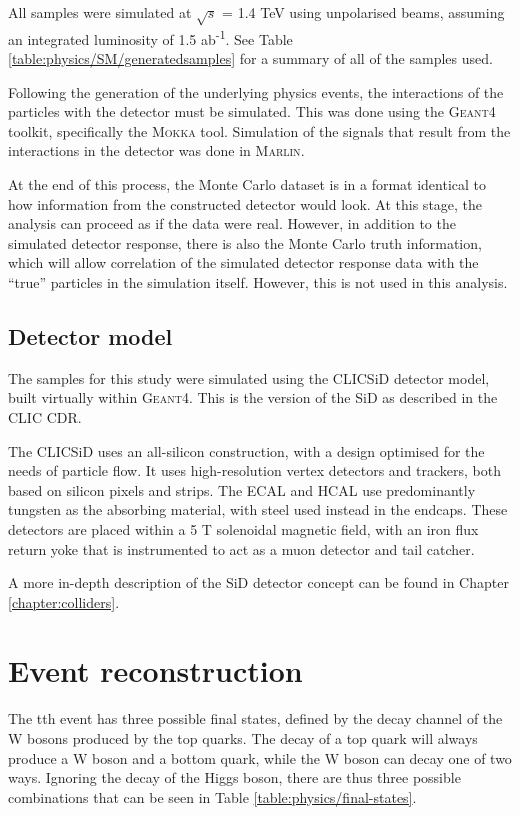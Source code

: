 All samples were simulated at $\sqrt{s}$ = 1.4 TeV using unpolarised beams, assuming an integrated luminosity of 1.5 ab\textsuperscript{-1}. See Table \ref{table:physics/SM/generatedsamples} for a summary of all of the samples used. 

Following the generation of the underlying physics events, the interactions of the particles with the detector must be simulated. This was done using the \textsc{Geant4} toolkit\cite{geant4}, specifically the \textsc{Mokka} tool. Simulation of the signals that result from the interactions in the detector was done in \textsc{Marlin}\cite{marlin}.

At the end of this process, the Monte Carlo dataset is in a format identical to how information from the constructed detector would look. At this stage, the analysis can proceed as if the data were real. However, in addition to the simulated detector response, there is also the Monte Carlo truth information, which will allow correlation of the simulated detector response data with the ``true'' particles in the simulation itself. However, this is not used in this analysis.

\subsection{Detector model}
The samples for this study were simulated using the CLIC\textunderscore SiD detector model, built virtually within \textsc{Geant4}\cite{clic-sid-geant4}. This is the version of the \acrfull{SiD} as described in the \acrlong{CLIC} \acrfull{CDR}.

The CLIC\textunderscore SiD uses an all-silicon construction, with a design optimised for the needs of particle flow. It uses high-resolution vertex detectors and trackers, both based on silicon pixels and strips. The \acrshort{ECAL} and \acrshort{HCAL} use predominantly tungsten as the absorbing material, with steel used instead in the endcaps. These detectors are placed within a 5 T solenoidal magnetic field, with an iron flux return yoke that is instrumented to act as a muon detector and tail catcher.

A more in-depth description of the \acrshort{SiD} detector concept can be found in Chapter \ref{chapter:colliders}.

\section{Event reconstruction}
The tth event has three possible final states, defined by the decay channel of the W bosons produced by the top quarks. The decay of a top quark will always produce a W boson and a bottom quark, while the W boson can decay one of two ways. Ignoring the decay of the Higgs boson, there are thus three possible combinations that can be seen in Table \ref{table:physics/final-states}. \\

